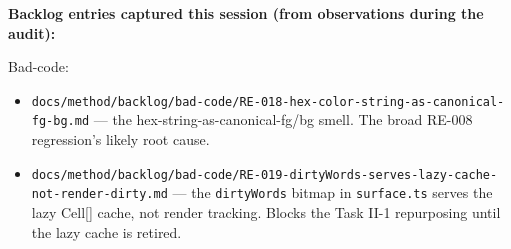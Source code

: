 \textbf{Backlog entries captured this session (from observations during the audit):}

Bad-code:

\begin{itemize}
\tightlist
\item
  \texttt{d\allowbreak{}o\allowbreak{}c\allowbreak{}s\allowbreak{}/\allowbreak{}m\allowbreak{}e\allowbreak{}t\allowbreak{}h\allowbreak{}o\allowbreak{}d\allowbreak{}/\allowbreak{}b\allowbreak{}a\allowbreak{}c\allowbreak{}k\allowbreak{}l\allowbreak{}o\allowbreak{}g\allowbreak{}/\allowbreak{}b\allowbreak{}a\allowbreak{}d\allowbreak{}-\allowbreak{}c\allowbreak{}o\allowbreak{}d\allowbreak{}e\allowbreak{}/\allowbreak{}R\allowbreak{}E\allowbreak{}-\allowbreak{}0\allowbreak{}1\allowbreak{}8\allowbreak{}-\allowbreak{}h\allowbreak{}e\allowbreak{}x\allowbreak{}-\allowbreak{}c\allowbreak{}o\allowbreak{}l\allowbreak{}o\allowbreak{}r\allowbreak{}-\allowbreak{}s\allowbreak{}t\allowbreak{}r\allowbreak{}i\allowbreak{}n\allowbreak{}g\allowbreak{}-\allowbreak{}a\allowbreak{}s\allowbreak{}-\allowbreak{}c\allowbreak{}a\allowbreak{}n\allowbreak{}o\allowbreak{}n\allowbreak{}i\allowbreak{}c\allowbreak{}a\allowbreak{}l\allowbreak{}-\allowbreak{}f\allowbreak{}g\allowbreak{}-\allowbreak{}b\allowbreak{}g\allowbreak{}.\allowbreak{}m\allowbreak{}d} --- the hex-string-as-canonical-fg/bg smell. The broad RE-008 regression's likely root cause.
\item
  \texttt{d\allowbreak{}o\allowbreak{}c\allowbreak{}s\allowbreak{}/\allowbreak{}m\allowbreak{}e\allowbreak{}t\allowbreak{}h\allowbreak{}o\allowbreak{}d\allowbreak{}/\allowbreak{}b\allowbreak{}a\allowbreak{}c\allowbreak{}k\allowbreak{}l\allowbreak{}o\allowbreak{}g\allowbreak{}/\allowbreak{}b\allowbreak{}a\allowbreak{}d\allowbreak{}-\allowbreak{}c\allowbreak{}o\allowbreak{}d\allowbreak{}e\allowbreak{}/\allowbreak{}R\allowbreak{}E\allowbreak{}-\allowbreak{}0\allowbreak{}1\allowbreak{}9\allowbreak{}-\allowbreak{}d\allowbreak{}i\allowbreak{}r\allowbreak{}t\allowbreak{}y\allowbreak{}W\allowbreak{}o\allowbreak{}r\allowbreak{}d\allowbreak{}s\allowbreak{}-\allowbreak{}s\allowbreak{}e\allowbreak{}r\allowbreak{}v\allowbreak{}e\allowbreak{}s\allowbreak{}-\allowbreak{}l\allowbreak{}a\allowbreak{}z\allowbreak{}y\allowbreak{}-\allowbreak{}c\allowbreak{}a\allowbreak{}c\allowbreak{}h\allowbreak{}e\allowbreak{}-\allowbreak{}n\allowbreak{}o\allowbreak{}t\allowbreak{}-\allowbreak{}r\allowbreak{}e\allowbreak{}n\allowbreak{}d\allowbreak{}e\allowbreak{}r\allowbreak{}-\allowbreak{}d\allowbreak{}i\allowbreak{}r\allowbreak{}t\allowbreak{}y\allowbreak{}.\allowbreak{}m\allowbreak{}d} --- the \texttt{d\allowbreak{}i\allowbreak{}r\allowbreak{}t\allowbreak{}y\allowbreak{}W\allowbreak{}o\allowbreak{}r\allowbreak{}d\allowbreak{}s} bitmap in \texttt{s\allowbreak{}u\allowbreak{}r\allowbreak{}f\allowbreak{}a\allowbreak{}c\allowbreak{}e\allowbreak{}.\allowbreak{}t\allowbreak{}s} serves the lazy Cell{[}{]} cache, not render tracking. Blocks the Task II-1 repurposing until the lazy cache is retired.

\end{itemize}
